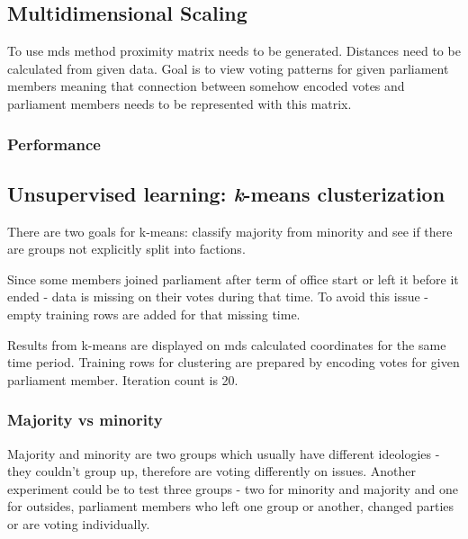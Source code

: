 \documentclass[a4paper,12pt]{article}
\begin{document}
   	\clearpage
   	   	
   	\subsection{Multidimensional Scaling}
   	
   	To use \acrshort{mds} method proximity matrix needs to be generated. Distances need to be calculated from given data. Goal is to view voting patterns for given parliament members meaning that connection between somehow encoded votes and parliament members needs to be represented with this matrix.
   	
   	\subsubsection{Performance}
   	   	
   	\clearpage
   	
   	\subsection{Unsupervised learning: {\textit k-means} clusterization }
   	
   		
   	There are two goals for \gls{k-means}: classify majority from minority and see if there are groups not explicitly split into factions.
   	
   	Since some members joined parliament after term of office start or left it before it ended - data is missing on their votes during that time. To avoid this issue - empty training rows are added for that missing time.
   	
	Results from \gls{k-means} are displayed on \acrshort{mds} calculated coordinates for the same time period. Training rows for clustering are prepared by encoding votes for given parliament member. Iteration count is 20.
	
	\subsubsection{Majority vs minority} 
	
	Majority and minority are two groups which usually have different ideologies - they couldn't group up, therefore are voting differently on issues. Another experiment could be to test three groups - two for minority and majority and one for outsides, parliament members who left one group or another, changed parties or are voting individually.
	
\end{document}
